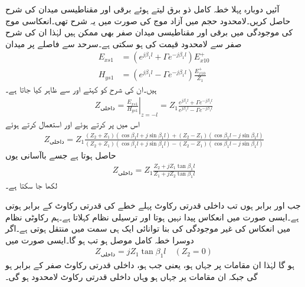 آئیں دوبارہ پہلا خطہ کامل ذو برق لیتے ہوئے برقی اور مقناطیسی میدان کی شرح حاصل کریں۔لامحدود حجم میں آزاد موج کی صورت میں یہ شرح  تھی۔انعکاسی موج کی موجودگی میں برقی اور مقناطیسی میدان صفر بھی ممکن ہیں لہٰذا ان کی شرح صفر سے لامحدود قیمت کی ہو سکتی ہے۔سرحد سے  فاصلے پر میدان
 \begin{align*}
E_{xs1}&=\left(e^{j \beta_1 l}+ \Gamma e^{-j \beta_1 l} \right)E_{x10}^+ \\
H_{ys1}&=\left(e^{j \beta_1 l}- \Gamma e^{-j \beta_1 l} \right) \frac{E_{x10}^+}{Z_1}
\end{align*}
ہیں۔ان کی شرح کو  کہتے اور  سے ظاہر کیا جاتا ہے۔
\begin{align*}
Z_{\text{داخلی}}=\left. \frac{E_{xs1}}{H_{ys1}} \right|_{z=-l}=Z_1 \frac{e^{j \beta_1 l}+ \Gamma e^{-j \beta_1 l}}{e^{j \beta_1 l}- \Gamma e^{-j \beta_1 l}}
\end{align*}
اس میں  پر کرتے ہوئے اور   استعمال کرتے ہوئے
\begin{align*}
Z_{\text{داخلی}}=Z_1 \frac{(Z_2+Z_1)(\cos \beta_1 l +j \sin \beta_1 l)+(Z_2-Z_1)(\cos \beta_1 l -j \sin \beta_1 l)}{(Z_2+Z_1)(\cos \beta_1 l +j \sin \beta_1 l)-(Z_2-Z_1)(\cos \beta_1 l -j \sin \beta_1 l)}
\end{align*}
حاصل ہوتا ہے  جسے باآسانی یوں
\begin{align}\label{مساوات+موج_ترسیلی_نظام_داخلی_قدرتی_رکاوٹ_تعریف}
Z_{\text{داخلی}}=Z_1 \frac{Z_2 +j Z_1 \tan \beta_1 l}{Z_1+j Z_2 \tan \beta_1 l}
\end{align}
لکھا جا سکتا ہے۔

جب  اور  برابر ہوں تب داخلی قدرتی رکاوٹ  پہلے خطے کی قدرتی رکاوٹ  کے برابر ہوتی ہے۔ایسی صورت میں انعکاس پیدا نہیں ہوتا اور  ترسیلی نظام  کہلاتا ہے۔ہم رکاوٹی نظام میں انعکاس کی غیر موجودگی کی بنا توانائی ایک ہی سمت میں منتقل ہوتی ہے۔اگر دوسرا خطہ کامل موصل ہو تب  ہو گا۔ایسی صورت میں
\begin{align}
Z_{\text{داخلی}}=j Z_1 \tan \beta_1 l \quad (Z_2=0)
\end{align}
ہو گا لہٰذا ان مقامات پر جہاں  ہو، یعنی جب  ہو، داخلی قدرتی رکاوٹ صفر کے برابر ہو گی جبکہ ان مقامات پر جہاں  ہو وہاں داخلی قدرتی رکاوٹ لامحدود ہو گی۔

